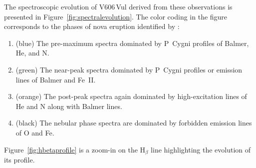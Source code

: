 \documentclass[twocolumn]{aastex631}
\newcommand{\nova}{V606\,Vul}
\begin{document}
The spectroscopic evolution of \nova{} derived from these observations 
is presented in Figure~\ref{fig:spectralevolution}. The color coding in the figure 
corresponds to the phases of nova eruption identified by \cite{2023arXiv230907097A}:
\begin{enumerate}
\item (blue) The pre-maximum spectra dominated by P~Cygni profiles of Balmer, He, and N. 
\item (green) The near-peak spectra dominated by P~Cygni profiles or emission lines of Balmer and Fe~II.
\item (orange) The post-peak spectra again dominated by high-excitation lines of He and N along with Balmer lines. 
\item (black) The nebular phase spectra are dominated by forbidden emission lines of O and Fe.
\end{enumerate}
Figure~\ref{fig:hbetaprofile} is a zoom-in on the H$_\beta$ line
highlighting the evolution of its profile.
\end{document}
